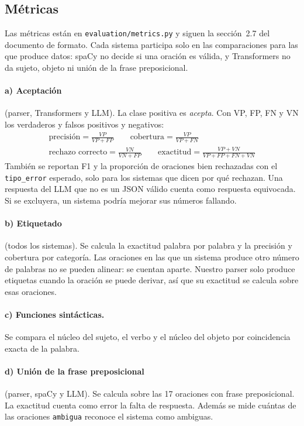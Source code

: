 \subsection{Métricas}

Las métricas están en \texttt{evaluation/metrics.py} y siguen la sección~2.7 del documento de
formato. Cada sistema participa solo en las comparaciones para las que produce datos: spaCy no
decide si una oración es válida, y Transformers no da sujeto, objeto ni unión de la frase
preposicional.

\paragraph{a) Aceptación} (parser, Transformers y LLM). La clase positiva es \emph{acepta}. Con
VP, FP, FN y VN los verdaderos y falsos positivos y negativos:
\begin{gather*}
  \text{precisión} = \frac{VP}{VP+FP} \qquad
  \text{cobertura} = \frac{VP}{VP+FN} \\
  \text{rechazo correcto} = \frac{VN}{VN+FP} \qquad
  \text{exactitud} = \frac{VP+VN}{VP+FP+FN+VN}
\end{gather*}
También se reportan F1 y la proporción de oraciones bien rechazadas con el \texttt{tipo\_error}
esperado, solo para los sistemas que dicen por qué rechazan. Una respuesta del LLM que no es un
JSON válido cuenta como respuesta equivocada. Si se excluyera, un sistema podría mejorar sus
números fallando.

\paragraph{b) Etiquetado} (todos los sistemas). Se calcula la exactitud palabra por palabra y la
precisión y cobertura por categoría. Las oraciones en las que un sistema produce otro número de
palabras no se pueden alinear: se cuentan aparte. Nuestro parser solo produce etiquetas cuando
la oración se puede derivar, así que su exactitud se calcula sobre esas oraciones.

\paragraph{c) Funciones sintácticas.} Se compara el núcleo del sujeto, el verbo y el núcleo del
objeto por coincidencia exacta de la palabra.

\paragraph{d) Unión de la frase preposicional} (parser, spaCy y LLM). Se calcula sobre las 17
oraciones con frase preposicional. La exactitud cuenta como error la falta de respuesta. Además
se mide cuántas de las oraciones \texttt{ambigua} reconoce el sistema como ambiguas.

